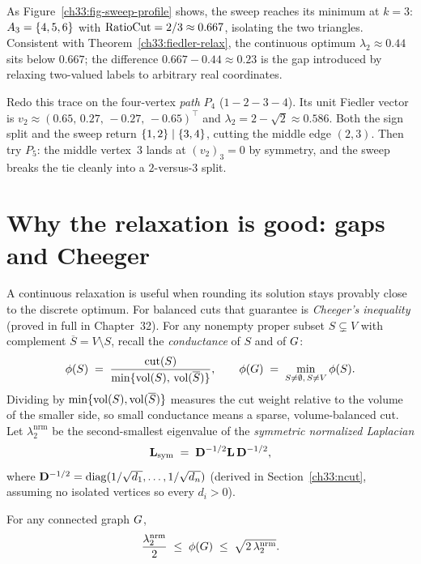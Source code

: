As Figure~\ref{ch33:fig-sweep-profile} shows, the sweep reaches its minimum at $k=3$: $A_3=\{4,5,6\}$ with $\operatorname{RatioCut} = 2/3 \approx 0.667$, isolating the two triangles. Consistent with Theorem~\ref{ch33:fiedler-relax}, the continuous optimum $\lambda_2\approx 0.44$ sits below $0.667$; the difference $0.667 - 0.44 \approx 0.23$ is the gap introduced by relaxing two-valued labels to arbitrary real coordinates.

\begin{labbox}
Redo this trace on the four-vertex \emph{path} $P_4$ ($1\!-\!2\!-\!3\!-\!4$). Its unit Fiedler vector is
$v_2 \approx (0.65,\,0.27,\,-0.27,\,-0.65)^\top$ and $\lambda_2 = 2-\sqrt{2}\approx 0.586$. Both the sign split and the sweep return
$\{1,2\}\mid\{3,4\}$, cutting the middle edge $(2,3)$. Then try $P_5$: the middle vertex~$3$ lands at $(v_2)_3 = 0$ by symmetry, and the sweep breaks the tie cleanly into a $2$-versus-$3$ split.
\end{labbox}

\section{Why the relaxation is good: gaps and Cheeger}
\label{ch33:cheeger}

A continuous relaxation is useful when rounding its solution stays provably close to the discrete optimum. For balanced cuts
that guarantee is \emph{Cheeger's inequality} (proved in full in Chapter~32). For any nonempty proper subset $S \subsetneq V$ with complement $\overline{S} = V \setminus S$, recall the
\emph{conductance} of $S$ and of $G$:
\[
  \phi(S) \;=\; \frac{\operatorname{cut}(S)}{\min\{\operatorname{vol}(S),\,\operatorname{vol}(\overline S)\}},
  \qquad
  \phi(G) \;=\; \min_{S\ne\emptyset,\,S\ne V} \phi(S).
\]
Dividing by $\min\{\operatorname{vol}(S),\operatorname{vol}(\overline{S})\}$ measures the cut weight relative to the volume of the smaller side, so small conductance means a sparse, volume-balanced cut. Let $\lambda_2^{\mathrm{nrm}}$
be the second-smallest eigenvalue of the \emph{symmetric normalized Laplacian}
\[
  \mathbf{L}_{\mathrm{sym}} \;=\; \mathbf{D}^{-1/2}\mathbf{L}\,\mathbf{D}^{-1/2},
\]
where $\mathbf{D}^{-1/2} = \operatorname{diag}(1/\sqrt{d_1},\dots,1/\sqrt{d_n})$ (derived in Section~\ref{ch33:ncut}, assuming no isolated vertices so every $d_i > 0$).

\begin{theorem}
\label{ch33:cheeger-thm}
For any connected graph $G$,
\[
  \frac{\lambda_2^{\mathrm{nrm}}}{2} \;\le\; \phi(G) \;\le\; \sqrt{2\,\lambda_2^{\mathrm{nrm}}}.
\]
\end{theorem}

